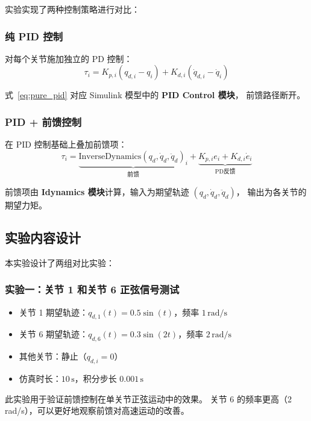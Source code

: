\documentclass[12pt,a4paper,oneside]{article}
\numberwithin{equation}{section}
\begin{document}
实验实现了两种控制策略进行对比：

\subsubsection{纯 PID 控制}

对每个关节施加独立的 PD 控制：
\begin{equation}
    \tau_i = K_{p,i} (q_{d,i} - q_i) + K_{d,i} (\dot{q}_{d,i} - \dot{q}_i)
    \label{eq:pure_pid}
\end{equation}

式~\eqref{eq:pure_pid} 对应 Simulink 模型中的 \textbf{PID Control 模块}，
前馈路径断开。

\subsubsection{PID + 前馈控制}

在 PID 控制基础上叠加前馈项：
\begin{equation}
    \tau_i = \underbrace{\text{InverseDynamics}(q_d, \dot{q}_d, \ddot{q}_d)_i}_{\text{前馈}} + \underbrace{K_{p,i}e_i + K_{d,i}\dot{e}_i}_{\text{PD反馈}}
    \label{eq:pid_feedforward}
\end{equation}

前馈项由 \textbf{Idynamics 模块}计算，输入为期望轨迹 $(q_d, \dot{q}_d, \ddot{q}_d)$，
输出为各关节的期望力矩。

\subsection{实验内容设计}

本实验设计了两组对比实验：

\subsubsection{实验一：关节 1 和关节 6 正弦信号测试}

\begin{itemize}
    \item 关节 1 期望轨迹：$q_{d,1}(t) = 0.5\sin(t)$，频率 $1 \, \text{rad/s}$
    \item 关节 6 期望轨迹：$q_{d,6}(t) = 0.3\sin(2t)$，频率 $2 \, \text{rad/s}$
    \item 其他关节：静止（$q_{d,i}=0$）
    \item 仿真时长：$10 \, \text{s}$，积分步长 $0.001 \, \text{s}$
\end{itemize}

此实验用于验证前馈控制在单关节正弦运动中的效果。
关节 6 的频率更高（2 rad/s），可以更好地观察前馈对高速运动的改善。
\end{document}
